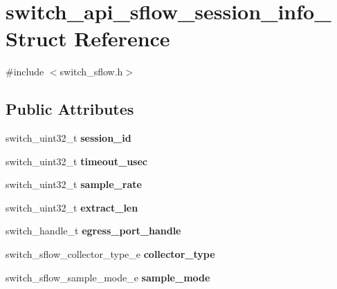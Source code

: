 \hypertarget{structswitch__api__sflow__session__info__}{\section{switch\+\_\+api\+\_\+sflow\+\_\+session\+\_\+info\+\_\+ Struct Reference}
\label{structswitch__api__sflow__session__info__}
}


{\ttfamily \#include $<$switch\+\_\+sflow.\+h$>$}

\subsection*{Public Attributes}
\begin{DoxyCompactItemize}
\item 
\hypertarget{structswitch__api__sflow__session__info___a441381ccd8b6525a863cb2e4e717f96c}{switch\+\_\+uint32\+\_\+t {\bfseries session\+\_\+id}}\label{structswitch__api__sflow__session__info___a441381ccd8b6525a863cb2e4e717f96c}

\item 
\hypertarget{structswitch__api__sflow__session__info___a847c1f42c9a34805cd26dd88de023df9}{switch\+\_\+uint32\+\_\+t {\bfseries timeout\+\_\+usec}}\label{structswitch__api__sflow__session__info___a847c1f42c9a34805cd26dd88de023df9}

\item 
\hypertarget{structswitch__api__sflow__session__info___a5c55de4233989e35e4d132ecb9a712a0}{switch\+\_\+uint32\+\_\+t {\bfseries sample\+\_\+rate}}\label{structswitch__api__sflow__session__info___a5c55de4233989e35e4d132ecb9a712a0}

\item 
\hypertarget{structswitch__api__sflow__session__info___ad4a133b6dd8395a7c39004e6fe1447ef}{switch\+\_\+uint32\+\_\+t {\bfseries extract\+\_\+len}}\label{structswitch__api__sflow__session__info___ad4a133b6dd8395a7c39004e6fe1447ef}

\item 
\hypertarget{structswitch__api__sflow__session__info___a17c56ff98b1bb98ea054fb985002b839}{switch\+\_\+handle\+\_\+t {\bfseries egress\+\_\+port\+\_\+handle}}\label{structswitch__api__sflow__session__info___a17c56ff98b1bb98ea054fb985002b839}

\item 
\hypertarget{structswitch__api__sflow__session__info___a0687a25c226500538ace66b5297d6520}{switch\+\_\+sflow\+\_\+collector\+\_\+type\+\_\+e {\bfseries collector\+\_\+type}}\label{structswitch__api__sflow__session__info___a0687a25c226500538ace66b5297d6520}

\item 
\hypertarget{structswitch__api__sflow__session__info___a9e20ad55fb2e0c1dd2c01116b754b31f}{switch\+\_\+sflow\+\_\+sample\+\_\+mode\+\_\+e {\bfseries sample\+\_\+mode}}\label{structswitch__api__sflow__session__info___a9e20ad55fb2e0c1dd2c01116b754b31f}

\end{DoxyCompactItemize}


